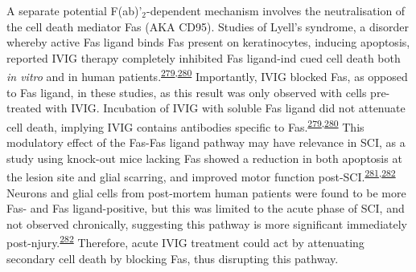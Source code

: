 \documentclass[
]{article}
\begin{document}
A separate potential F(ab)'\(_2\)-dependent mechanism involves the neutralisation of the cell death mediator Fas (AKA CD95).
Studies of Lyell's syndrome, a disorder whereby active Fas ligand binds Fas present on keratinocytes, inducing apoptosis, reported IVIG therapy completely inhibited Fas ligand-ind cued cell death both \emph{in vitro} and in human patients.\textsuperscript{\protect\hyperlink{ref-viard_inhibition_1998}{279},\protect\hyperlink{ref-altznauer_concurrent_2003}{280}}
Importantly, IVIG blocked Fas, as opposed to Fas ligand, in these studies, as this result was only observed with cells pre-treated with IVIG.
Incubation of IVIG with soluble Fas ligand did not attenuate cell death, implying IVIG contains antibodies specific to Fas.\textsuperscript{\protect\hyperlink{ref-viard_inhibition_1998}{279},\protect\hyperlink{ref-altznauer_concurrent_2003}{280}}
This modulatory effect of the Fas-Fas ligand pathway may have relevance in SCI, as a study using knock-out mice lacking Fas showed a reduction in both apoptosis at the lesion site and glial scarring, and improved motor function post-SCI.\textsuperscript{\protect\hyperlink{ref-sobrido-camean_role_2018}{281},\protect\hyperlink{ref-yu_fasfasl-mediated_2011}{282}}
Neurons and glial cells from post-mortem human patients were found to be more Fas- and Fas ligand-positive, but this was limited to the acute phase of SCI, and not observed chronically, suggesting this pathway is more significant immediately post-njury.\textsuperscript{\protect\hyperlink{ref-yu_fasfasl-mediated_2011}{282}}
Therefore, acute IVIG treatment could act by attenuating secondary cell death by blocking Fas, thus disrupting this pathway.
\end{document}
